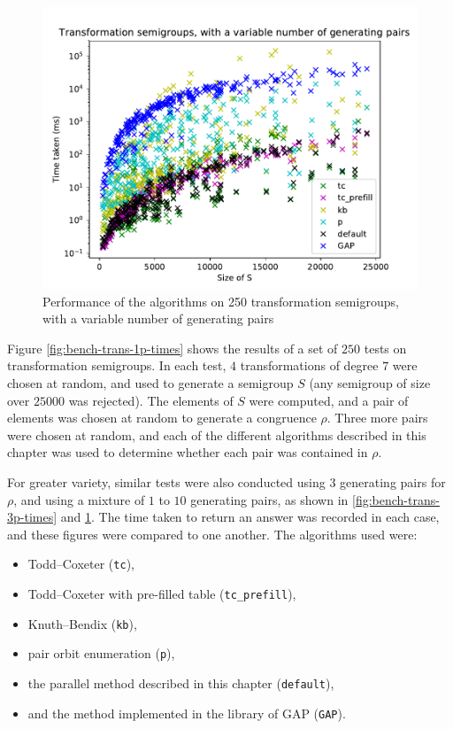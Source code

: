 \begin{figure}[h]
  \centering
  \includegraphics[width=\textwidth]{pics/ch-pairs/bench-trans-vp-times}
  \caption[Benchmark: all algorithms, concrete, $n$ pairs]
  {Performance of the algorithms on 250 transformation semigroups, with
    a variable number of generating pairs}
  \label{fig:bench-trans-vp-times}
\end{figure}

Figure \ref{fig:bench-trans-1p-times} shows the results of a set of $250$ tests
on transformation semigroups.  In each test, $4$ transformations of degree $7$
were chosen at random, and used to generate a semigroup $S$ (any semigroup of
size over $25000$ was rejected).  The elements of $S$ were computed, and a pair
of elements was chosen at random to generate a congruence $\rho$.  Three more
pairs were chosen at random, and each of the different algorithms described in
this chapter was used to determine whether each pair was contained in $\rho$.

For greater variety, similar tests were also conducted using $3$ generating
pairs for $\rho$, and using a mixture of $1$ to $10$ generating pairs,
as shown in \ref{fig:bench-trans-3p-times} and \ref{fig:bench-trans-vp-times}.
The time taken to return an answer was recorded in each case, and these figures
were compared to one another.  The algorithms used were:
\begin{itemize}
\item Todd--Coxeter (\texttt{tc}),
\item Todd--Coxeter with pre-filled table (\texttt{tc\_prefill}),
\item Knuth--Bendix (\texttt{kb}),
\item pair orbit enumeration (\texttt{p}),
\item the parallel method described in this chapter (\texttt{default}),
\item and the method implemented in the library of GAP (\texttt{GAP}).
\end{itemize}

